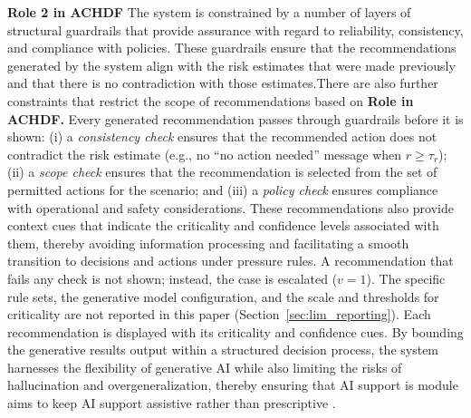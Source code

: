 \documentclass[journal]{IEEEtran}
\theoremstyle{plain}
\theoremstyle{definition}
\providecommand{\DIFaddtex}[1]{{\protect\color{blue} \sf #1}} %
\providecommand{\DIFdeltex}[1]{{\protect\color{red} \scriptsize #1}} %
\providecommand{\DIFaddbegin}{} %
\providecommand{\DIFaddend}{} %
\providecommand{\DIFdelbegin}{} %
\providecommand{\DIFdelend}{} %
\providecommand{\DIFadd}[1]{\texorpdfstring{\DIFaddtex{#1}}{#1}} %
\providecommand{\DIFdel}[1]{\texorpdfstring{\DIFdeltex{#1}}{}} %
\newcommand{\DIFscaledelfig}{0.5}
\newlength{\DIFdelgraphicswidth} %
\newlength{\DIFdelgraphicsheight} %
\newcommand{\DIFaddincludegraphics}[2][]{{\color{blue}\fbox{\DIFOincludegraphics[#1]{#2}}}} %
\newcommand{\DIFdelincludegraphics}[2][]{%
\sbox{\DIFdelgraphicsbox}{\DIFOincludegraphics[#1]{#2}}%
\settoboxwidth{\DIFdelgraphicswidth}{\DIFdelgraphicsbox} %
\settoboxtotalheight{\DIFdelgraphicsheight}{\DIFdelgraphicsbox} %
\scalebox{\DIFscaledelfig}{%
\parbox[b]{\DIFdelgraphicswidth}{\usebox{\DIFdelgraphicsbox}\\[-\baselineskip] \rule{\DIFdelgraphicswidth}{0em}}\llap{\resizebox{\DIFdelgraphicswidth}{\DIFdelgraphicsheight}{%
\setlength{\unitlength}{\DIFdelgraphicswidth}%
\begin{picture}(1,1)%
\thicklines\linethickness{2pt} %
{\color[rgb]{1,0,0}\put(0,0){\framebox(1,1){}}}%
{\color[rgb]{1,0,0}\put(0,0){\line( 1,1){1}}}%
{\color[rgb]{1,0,0}\put(0,1){\line(1,-1){1}}}%
\end{picture}%
}\hspace*{3pt}}} %
} %
\DeclareRobustCommand{\DIFaddbegin}{\DIFOaddbegin \let\includegraphics\DIFaddincludegraphics} %
\DeclareRobustCommand{\DIFaddend}{\DIFOaddend \let\includegraphics\DIFOincludegraphics} %
\DeclareRobustCommand{\DIFdelbegin}{\DIFOdelbegin \let\includegraphics\DIFdelincludegraphics} %
\DeclareRobustCommand{\DIFdelend}{\DIFOaddend \let\includegraphics\DIFOincludegraphics} %
\begin{document}
    \DIFdelbegin \DIFdel{\textbf{Role 2 in ACHDF}
    The system is constrained by a number of layers of structural guardrails that provide assurance with regard to reliability, consistency, and compliance with policies.
These guardrails ensure that the recommendations generated by the system align with the risk estimates that were made previously and that there is no contradiction with those estimates.There are also further constraints that restrict the scope of recommendations based on }\DIFdelend \DIFaddbegin \DIFadd{\textbf{Role in ACHDF.}
    Every generated recommendation passes through guardrails before it is shown: (i) a \emph{consistency check} ensures that the recommended action does not contradict the risk estimate (e.g., no ``no action needed'' message when $r \ge \tau_r$); (ii) a \emph{scope check} ensures that the recommendation is selected from the set of permitted actions for the scenario; and (iii) a \emph{policy check} ensures compliance with }\DIFaddend operational and safety \DIFdelbegin \DIFdel{considerations. These recommendations also provide context cues that indicate the criticality and confidence levels associated with them, thereby avoiding information processing and facilitating a smooth transition to decisions and actions under pressure}\DIFdelend \DIFaddbegin \DIFadd{rules. A recommendation that fails any check is not shown; instead, the case is escalated ($v=1$).
    The specific rule sets, the generative model configuration, and the scale and thresholds for criticality are not reported in this paper (Section~\ref{sec:lim_reporting}).
    Each recommendation is displayed with its criticality and confidence cues}\DIFaddend . By bounding the generative \DIFdelbegin \DIFdel{results }\DIFdelend \DIFaddbegin \DIFadd{output }\DIFaddend within a structured decision process, the \DIFdelbegin \DIFdel{system harnesses the flexibility of generative AI while also limiting the risks of hallucination and overgeneralization, thereby ensuring that AI support is }\DIFdelend \DIFaddbegin \DIFadd{module aims to keep AI support }\DIFaddend assistive rather than prescriptive \DIFdelbegin \DIFdel{.
    }%
\end{document}
